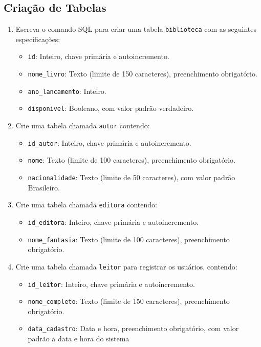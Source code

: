 \subsection{Criação de Tabelas}
\begin{enumerate}
    \item Escreva o comando SQL para criar uma tabela \texttt{biblioteca} com as seguintes especificações:
    \begin{itemize}
        \item \texttt{id}: Inteiro, chave primária e autoincremento.
        \item \texttt{nome\_livro}: Texto (limite de 150 caracteres), preenchimento obrigatório.
        \item \texttt{ano\_lancamento}: Inteiro.
        \item \texttt{disponivel}: Booleano, com valor padrão verdadeiro.
    \end{itemize}

    \item Crie uma tabela chamada \texttt{autor} contendo:
    \begin{itemize}
        \item \texttt{id\_autor}: Inteiro, chave primária e autoincremento.
        \item \texttt{nome}: Texto (limite de 100 caracteres), preenchimento obrigatório.
        \item \texttt{nacionalidade}: Texto (limite de 50 caracteres), com valor padrão Brasileiro.
    \end{itemize}

    \item Crie uma tabela chamada \texttt{editora} contendo:
    \begin{itemize}
        \item \texttt{id\_editora}: Inteiro, chave primária e autoincremento.
        \item \texttt{nome\_fantasia}: Texto (limite de 100 caracteres), preenchimento obrigatório.
    \end{itemize}

    \item Crie uma tabela chamada \texttt{leitor} para registrar os usuários, contendo:
    \begin{itemize}
        \item \texttt{id\_leitor}: Inteiro, chave primária e autoincremento.
        \item \texttt{nome\_completo}: Texto (limite de 150 caracteres), preenchimento obrigatório.
        \item \texttt{data\_cadastro}: Data e hora, preenchimento obrigatório, com valor padrão a data e hora do sistema
    \end{itemize}


\end{enumerate}
